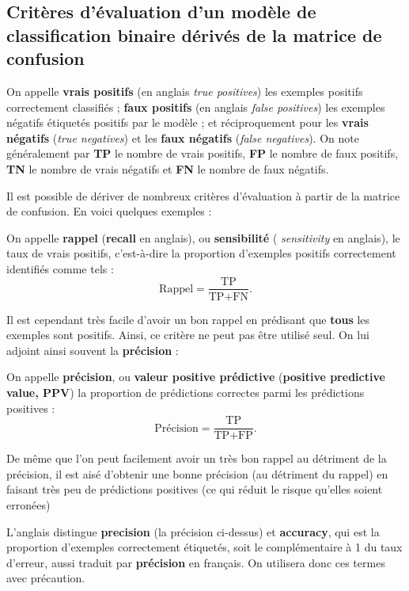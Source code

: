\subsection{Critères d'évaluation d'un modèle de classification binaire dérivés de la matrice de confusion}
\label{sec:confusion_matrix_derived}

On appelle \textbf{vrais positifs} (en anglais \textit{true positives}) les
exemples positifs correctement classifiés ; \textbf{faux positifs} (en anglais
\textit{false positives}) les exemples négatifs étiquetés positifs par le
modèle ; et réciproquement pour les \textbf{vrais négatifs} (\textit{true
  negatives}) et les \textbf{faux négatifs} (\textit{false negatives}). On note
généralement par \textbf{TP} le nombre de vrais positifs, \textbf{FP} le nombre
de faux positifs, \textbf{TN} le nombre de vrais négatifs et \textbf{FN} le
nombre de faux négatifs.

Il est possible de dériver de nombreux critères d'évaluation à partir de la
matrice de confusion. En voici quelques exemples :

On appelle \textbf{rappel} (\textbf{recall} en anglais), ou \textbf{sensibilité} ({\it
  sensitivity} en anglais), le taux de vrais positifs, c'est-à-dire la
proportion d'exemples positifs correctement identifiés comme tels :
\begin{equation*}
  \text{Rappel} = \frac{\text{TP}}{\text{TP} + \text{FN}}.
\end{equation*}

Il est cependant très facile d'avoir un bon rappel en prédisant que \textbf{tous}
les exemples sont positifs. Ainsi, ce critère ne peut pas être utilisé seul. On
lui adjoint ainsi souvent la \textbf{précision} :

On appelle \textbf{précision}, ou \textbf{valeur positive prédictive} (\textbf{positive
  predictive value, PPV}) la proportion de prédictions correctes parmi les
prédictions positives :
\begin{equation*}
  \text{Précision} = \frac{\text{TP}}{\text{TP} + \text{FP}}.
\end{equation*}

De même que l'on peut facilement avoir un très bon rappel au détriment de la
précision, il est aisé d'obtenir une bonne précision (au détriment du rappel)
en faisant très peu de prédictions positives (ce qui réduit le risque qu'elles
soient erronées)

L'anglais distingue \textbf{precision} (la précision ci-dessus) et \textbf{accuracy},
qui est la proportion d'exemples correctement étiquetés, soit le complémentaire
à 1 du taux d'erreur, aussi traduit par \textbf{précision} en français. On
utilisera donc ces termes avec précaution.

